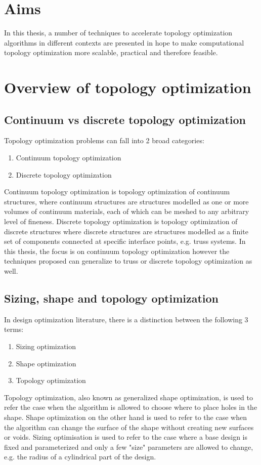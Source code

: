 \newpage
\section{Aims}

In this thesis, a number of techniques to accelerate topology optimization algorithms in different contexts are presented in hope to make computational topology optimization more scalable, practical and therefore feasible.

\newpage
\section{Overview of topology optimization}

\subsection{Continuum vs discrete topology optimization}

Topology optimization problems can fall into 2 broad categories:
\begin{enumerate}
    \item Continuum topology optimization
    \item Discrete topology optimization
\end{enumerate}
Continuum topology optimization is topology optimization of continuum structures, where continuum structures are structures modelled as one or more volumes of continuum materials, each of which can be meshed to any arbitrary level of fineness. Discrete topology optimization is topology optimization of discrete structures where discrete structures are structures modelled as a finite set of components connected at specific interface points, e.g. truss systems. In this thesis, the focus is on continuum topology optimization however the techniques proposed can generalize to truss or discrete topology optimization as well.

\subsection{Sizing, shape and topology optimization}

In design optimization literature, there is a distinction between the following 3 terms:
\begin{enumerate}
    \item Sizing optimization
    \item Shape optimization
    \item Topology optimization
\end{enumerate}
Topology optimization, also known as generalized shape optimization, is used to refer the case when the algorithm is allowed to choose where to place holes in the shape. Shape optimization on the other hand is used to refer to the case when the algorithm can change the surface of the shape without creating new surfaces or voids. Sizing optimisation is used to refer to the case where a base design is fixed and parameterized and only a few "size" parameters are allowed to change, e.g. the radius of a cylindrical part of the design.

